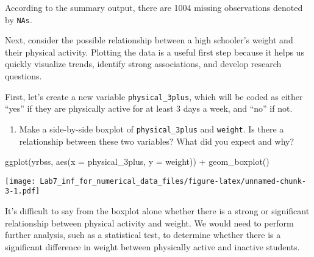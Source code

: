 \documentclass[
]{article}
\newenvironment{Shaded}{\begin{snugshade}}{\end{snugshade}}
\newcommand{\AttributeTok}[1]{\textcolor[rgb]{0.77,0.63,0.00}{#1}}
\newcommand{\DecValTok}[1]{\textcolor[rgb]{0.00,0.00,0.81}{#1}}
\newcommand{\FunctionTok}[1]{\textcolor[rgb]{0.00,0.00,0.00}{#1}}
\newcommand{\NormalTok}[1]{#1}
\newcommand{\OtherTok}[1]{\textcolor[rgb]{0.56,0.35,0.01}{#1}}
\newcommand{\SpecialCharTok}[1]{\textcolor[rgb]{0.00,0.00,0.00}{#1}}
\newcommand{\StringTok}[1]{\textcolor[rgb]{0.31,0.60,0.02}{#1}}
\providecommand{\tightlist}{%
  \setlength{\itemsep}{0pt}\setlength{\parskip}{0pt}}
\begin{document}
According to the summary output, there are 1004 missing observations
denoted by \texttt{NA\textquotesingle{}s}.

Next, consider the possible relationship between a high schooler's
weight and their physical activity. Plotting the data is a useful first
step because it helps us quickly visualize trends, identify strong
associations, and develop research questions.

First, let's create a new variable \texttt{physical\_3plus}, which will
be coded as either ``yes'' if they are physically active for at least 3
days a week, and ``no'' if not.

\begin{Shaded}
\end{Shaded}

\begin{enumerate}
\def\labelenumi{\arabic{enumi}.}
\setcounter{enumi}{2}
\tightlist
\item
  Make a side-by-side boxplot of \texttt{physical\_3plus} and
  \texttt{weight}. Is there a relationship between these two variables?
  What did you expect and why?
\end{enumerate}

\begin{Shaded}
\begin{Highlighting}[]
\FunctionTok{ggplot}\NormalTok{(yrbss, }\FunctionTok{aes}\NormalTok{(}\AttributeTok{x =}\NormalTok{ physical\_3plus, }\AttributeTok{y =}\NormalTok{ weight)) }\SpecialCharTok{+} 
  \FunctionTok{geom\_boxplot}\NormalTok{()}
\end{Highlighting}
\end{Shaded}

\texttt{[image: Lab7\_inf\_for\_numerical\_data\_files/figure-latex/unnamed-chunk-3-1.pdf]}

It's difficult to say from the boxplot alone whether there is a strong
or significant relationship between physical activity and weight. We
would need to perform further analysis, such as a statistical test, to
determine whether there is a significant difference in weight between
physically active and inactive students.
\end{document}
